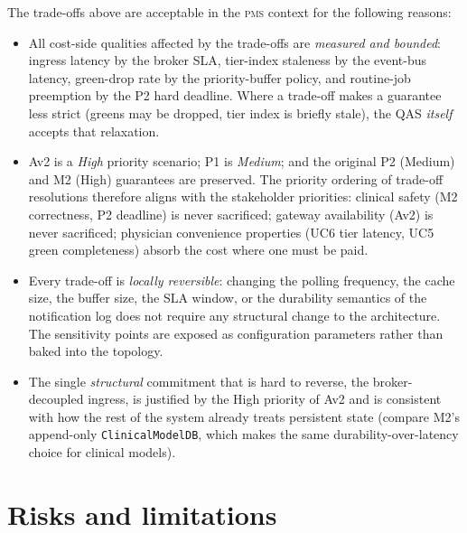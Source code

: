 The trade-offs above are acceptable in the \textsc{pms} context for the
following reasons:
\begin{itemize}
  \item All cost-side qualities affected by the trade-offs are
        \emph{measured and bounded}: ingress latency by the broker SLA,
        tier-index staleness by the event-bus latency, green-drop rate
        by the priority-buffer policy, and routine-job preemption by
        the P2 hard deadline. Where a trade-off makes a guarantee less
        strict (greens may be dropped, tier index is briefly stale),
        the QAS \emph{itself} accepts that relaxation.
  \item Av2 is a \emph{High} priority scenario; P1 is \emph{Medium};
        and the original P2 (Medium) and M2 (High) guarantees are
        preserved. The priority ordering of trade-off resolutions
        therefore aligns with the stakeholder priorities: clinical
        safety (M2 correctness, P2 deadline) is never sacrificed;
        gateway availability (Av2) is never sacrificed; physician
        convenience properties (UC6 tier latency, UC5 green
        completeness) absorb the cost where one must be paid.
  \item Every trade-off is \emph{locally reversible}: changing the
        polling frequency, the cache size, the buffer size, the SLA
        window, or the durability semantics of the notification log
        does not require any structural change to the architecture.
        The sensitivity points are exposed as configuration parameters
        rather than baked into the topology.
  \item The single \emph{structural} commitment that is hard to reverse,
        the broker-decoupled ingress, is justified by the High
        priority of Av2 and is consistent with how the rest of the
        system already treats persistent state (compare M2's
        append-only \texttt{ClinicalModelDB}, which makes the same
        durability-over-latency choice for clinical models).
\end{itemize}

\section{Risks and limitations}

